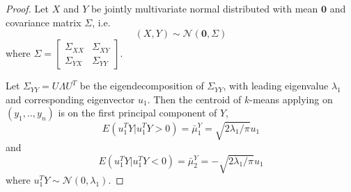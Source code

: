 \documentclass[12pt]{article}
\begin{document}
\begin{proof}
Let $X$ and $Y$ be jointly multivariate normal distributed with mean $\mathbf{0}$ and covariance matrix $\Sigma$, i.e.
\[	(X,Y) \sim \mathcal{N} \left( \mathbf{0}, \Sigma\right)	\]
where $\Sigma=\begin{bmatrix} \Sigma_{XX} & \Sigma_{XY} \\  \Sigma_{YX} & \Sigma_{YY} \end{bmatrix}$.

Let $\Sigma_{YY} = U \Lambda U^T$  be the eigendecomposition of $\Sigma_{YY}$,
with leading eigenvalue $\lambda_1$ and corresponding eigenvector $u_1$. Then
the centroid of $k$-means applying on $(y_1,..,y_n)$ is on the first principal
component
of $Y$,\[	E(u^T_1 Y|u^T_1 Y>0) = \bar{\mu}^Y_1 =\sqrt{2 \lambda_1/\pi}u_1\] and 
\[	E(u^T_1 Y|u^T_1 Y<0) = \bar{\mu}^Y_2 =-\sqrt{2 \lambda_1/\pi}u_1\]
 where $u^T_1 Y \sim \mathcal{N}(0,\lambda_1)$.


\end{proof}
\end{document}
